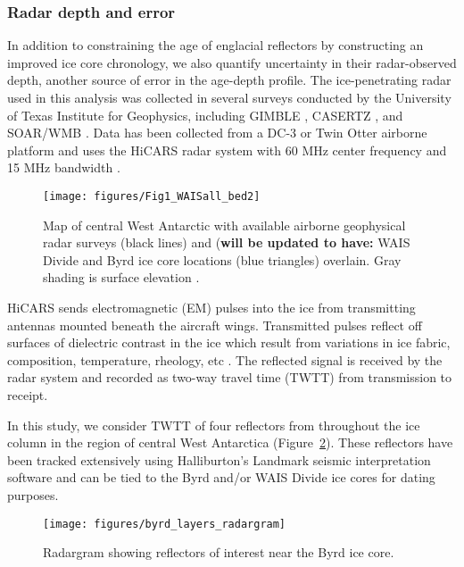 \subsubsection{Radar depth and error}
In addition to constraining the age of englacial reflectors by constructing an improved ice core chronology, we also quantify uncertainty in their radar-observed depth, another source of error in the age-depth profile. The ice-penetrating radar used in this analysis was collected in several surveys conducted by the University of Texas Institute for Geophysics, including GIMBLE \citep{young2012}, CASERTZ \citep{blankenship2001}, and SOAR/WMB \citep{luyendyk2003}. Data has been collected from a DC-3 or Twin Otter airborne platform and uses the HiCARS radar system with 60 MHz center frequency and 15 MHz bandwidth \citep{peters2005}. 


\begin{figure}[h]\label{fig:radarmap}
\centering
\texttt{[image: figures/Fig1\_WAISall\_bed2]}
\caption{Map of central West Antarctic with available airborne geophysical radar surveys (black lines) and (\textbf{will be updated to have:} WAIS Divide and Byrd ice core locations (blue triangles) overlain. Gray shading is surface elevation \citep{fretwell2013}. }

\end{figure}


HiCARS sends electromagnetic (EM) pulses into the ice from transmitting antennas mounted beneath the aircraft wings. Transmitted pulses reflect off surfaces of dielectric contrast in the ice which result from variations in ice fabric, composition, temperature, rheology, etc \citep{fujita2000}. The reflected signal is received by the radar system and recorded as two-way travel time (TWTT) from transmission to receipt. 

In this study, we consider TWTT of four reflectors from throughout the ice column in the region of central West Antarctica (Figure~\ref{fig:layergram}). These reflectors have been tracked extensively using Halliburton's Landmark seismic interpretation software and can be tied to the Byrd and/or WAIS Divide ice cores for dating purposes. %

\begin{figure}[h]
\centering
\texttt{[image: figures/byrd\_layers\_radargram]}
\caption{Radargram showing reflectors of interest near the Byrd ice core.  }
\label{fig:layergram}
\end{figure}


